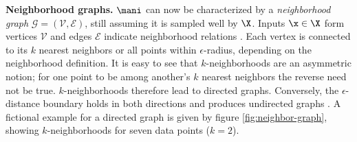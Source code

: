 \begin{minipage}[b]{0.5\textwidth}
  \textbf{Neighborhood graphs.}
  $\mani$ can now be characterized by a \textit{neighborhood 
  graph} $\mathcal{G} = (\mathcal{V}, \mathcal{E})$, still assuming it is 
  sampled well by $\X$. 
  Inputs $\x \in \X$ form vertices $\mathcal{V}$ and edges $\mathcal{E}$ 
  indicate neighborhood relations \citep{belkinniyogi2001}.
  Each vertex is connected to its $k$ nearest neighbors or all points 
  within $\epsilon$-radius, depending on the neighborhood definition.
  It is easy to see that $k$-neighborhoods are an asymmetric notion; for one 
  point to be among another's $k$ nearest neighbors the reverse need not be 
  true.
  $k$-neighborhoods therefore lead to directed graphs.
  Conversely, the $\epsilon$-distance boundary holds in both directions and 
  produces undirected graphs \citep{heetal2005}.
  A fictional example for a directed graph is given by figure 
  \ref{fig:neighbor-graph}, showing $k$-neighborhoods for seven data points 
  ($k = 2$).
\end{minipage}
\begin{minipage}[b]{0.05\textwidth}
  \phantom{xxx}
\end{minipage}

